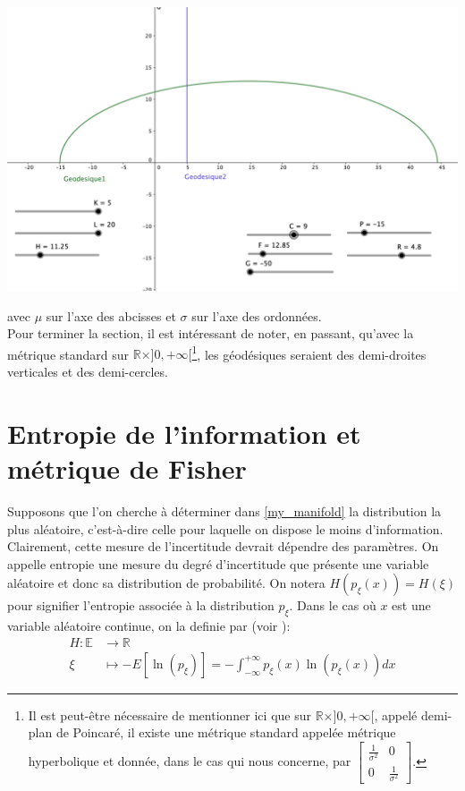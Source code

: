 \documentclass[11pt, letterpaper]{article}
\begin{document}
	\begin{center}
	    \includegraphics[scale=0.40]{image.png}
	\end{center}    
	avec $\mu$ sur l'axe des abcisses et $\sigma$ sur l'axe des ordonnées.\\     
	
	Pour terminer la section, il est intéressant de noter, en passant, qu'avec la métrique standard sur $\mathbb{R}\times ]{0,+\infty[}$\footnote{Il est peut-être nécessaire de mentionner ici que sur $\mathbb{R}\times ]{0,+\infty[}$, appelé demi-plan de Poincaré, il existe une métrique standard appelée métrique hyperbolique et donnée, dans le cas qui nous concerne, par $\begin{bmatrix}
	    \frac{1}{\sigma^2} & 0
	    \\
	    0 & \frac{1}{\sigma^2}
	    \end{bmatrix}$.}, les géodésiques seraient des demi-droites verticales et des demi-cercles.\\
	
	
	
	\section{Entropie de l'information et métrique de Fisher}
	Supposons que l'on cherche à déterminer dans \eqref{my_manifold} la distribution la plus aléatoire, c'est-à-dire celle pour laquelle on dispose le moins d'information. Clairement, cette mesure  de l'incertitude devrait dépendre des paramètres. On appelle entropie une mesure du degré d'incertitude que présente une variable aléatoire et donc sa distribution de probabilité. On notera $H(p_{\xi}(x))=H(\xi)$ pour signifier l'entropie associée à la distribution $p_{\xi}$. Dans le cas où $x$ est une variable aléatoire continue, on la definie par (voir \cite[Section 3.2]{calin2014geometric}):
	\begin{equation}\label{entropie}
	    \begin{aligned}
	    H\colon\mathbb{E} &\longrightarrow\mathbb{R} \\
	    \xi &\longmapsto -E\left[\ln(p_{\xi})\right]=-\int_{-\infty}^{+\infty}p_{\xi}(x)\ln(p_{\xi}(x))dx 
	\end{aligned}
	\end{equation}
	
\end{document}
